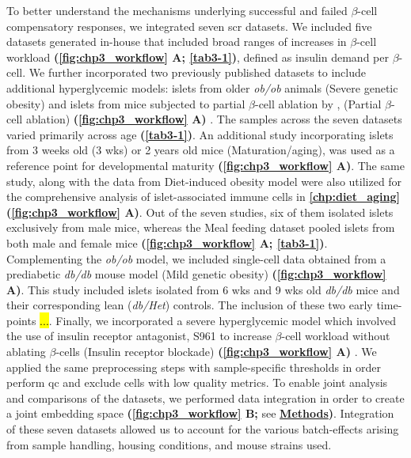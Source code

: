 \par To better understand the mechanisms underlying successful and failed $\beta$-cell compensatory responses, we integrated seven \gls{scr} datasets. We included five datasets generated in-house that included broad ranges of increases in $\beta$-cell workload \textbf{(\autoref{fig:chp3_workflow} A; \autoref{tab3-1})}, defined as insulin demand per $\beta$-cell. We further incorporated two previously published datasets to include  additional hyperglycemic models: islets from older \textit{ob/ob} animals (Severe genetic obesity) and islets from mice subjected to partial $\beta$-cell ablation by , (Partial $\beta$-cell ablation) \textbf{(\autoref{fig:chp3_workflow} A)} \textbf{\cite{chung_endocrine-exocrine_2020,sachs_targeted_2020}}. The samples across the seven datasets varied primarily across age \textbf{(\autoref{tab3-1})}. An additional study incorporating islets from 3 weeks old (3 wks) or 2 years old mice (Maturation/aging), was used as a reference point for developmental maturity \textbf{(\autoref{fig:chp3_workflow} A)}. The same study, along with the data from Diet-induced obesity model were also utilized for the comprehensive analysis of islet-associated immune cells in \textbf{\autoref{chp:diet_aging}} \textbf{(\autoref{fig:chp3_workflow} A)}. Out of the seven studies, six of them isolated islets exclusively from male mice, whereas the Meal feeding dataset pooled islets from both male and female mice \textbf{(\autoref{fig:chp3_workflow} A; \autoref{tab3-1})}. Complementing the \textit{ob/ob} model, we included single-cell data obtained from a prediabetic \textit{db/db} mouse model (Mild genetic obesity) \textbf{(\autoref{fig:chp3_workflow} A)}. This study included islets isolated from 6 wks and 9 wks old \textit{db/db} mice and their corresponding lean (\textit{db/Het}) controls. The inclusion of these two early time-points \hl{...}. Finally, we incorporated a severe hyperglycemic model which involved the use of insulin receptor antagonist, S961 to increase $\beta$-cell workload without ablating $\beta$-cells (Insulin receptor blockade) \textbf{(\autoref{fig:chp3_workflow} A)} \textbf{\cite{wortham_metabolic_2024}}. We applied the same preprocessing steps with sample-specific thresholds in order perform \gls{qc} and exclude cells with low quality metrics. To enable joint analysis and comparisons of the datasets, we performed data integration in order to create a joint embedding space \textbf{(\autoref{fig:chp3_workflow} B;} see \hyperref[sec:chp3_methods]{\textbf{Methods}}\textbf{)}. Integration of these seven datasets allowed us to account for the various batch-effects arising from sample handling, housing conditions, and mouse strains used.\\



